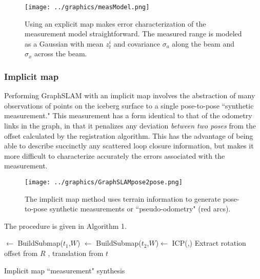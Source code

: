 \begin{figure}[htb]
   \centering
   \texttt{[image: ../graphics/measModel.png]} %
   \caption{Using an explicit map makes error characterization of the measurement model straightforward. The measured range is modeled as a Gaussian with mean $z_t^i$ and covariance $\sigma_{a}$ along the beam and $\sigma_{x}$ across the beam.}
   \label{fig:GraphSLAMmeasModel}
\end{figure}

\subsubsection{Implicit map}

Performing GraphSLAM with an implicit map involves the abstraction of many observations of points on the iceberg surface to a single pose-to-pose ``synthetic measurement." This measurement has a form identical to that of the odometry links in the graph, in that it penalizes any deviation \emph{between two poses} from the offset calculated by the registration algorithm.  This has the advantage of being able to describe succinctly any scattered loop closure information, but makes it more difficult to characterize accurately the errors associated with the measurement. 

\begin{figure}[htb]
   \centering
   \texttt{[image: ../graphics/GraphSLAMpose2pose.png]} %
   \caption{The implicit map method uses terrain information to generate pose-to-pose synthetic measurements or ``pseudo-odometry" (red arcs). }
   \label{fig:RelativePoses}
\end{figure}

The procedure is given in Algorithm 1.


\begin{algorithm}[H]
\DontPrintSemicolon
\SetAlgoLined
{}
\MapOne $\leftarrow$ BuildSubmap($t_1$,$W$) \;
\MapTwo $\leftarrow$ BuildSubmap($t_2$,$W$)\;
[$R$, $t$] $\leftarrow$ ICP(\MapOne,\MapTwo)  \;
Extract rotation offset from $R$ , translation from $t$\;
 \caption{Implicit map ``measurement" synthesis}
\end{algorithm} 


